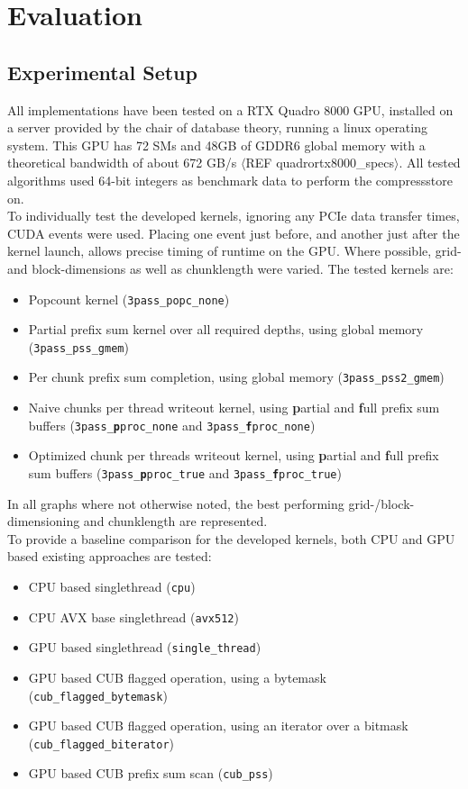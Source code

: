 \documentclass{tudscrreprt}
\newcommand{\markr}[1]{\textcolor{review}{$\langle$#1$\rangle$}}
\begin{document}
	\chapter{Evaluation}
	
		\section{Experimental Setup}
			All implementations have been tested on a RTX Quadro 8000 GPU, installed on a server provided by the chair of database theory, running a linux operating system. This GPU has 72 SMs and 48GB of GDDR6 global memory with a theoretical bandwidth of about 672 GB/s \markr{REF quadrortx8000\_specs}. All tested algorithms used 64-bit integers as benchmark data to perform the compressstore on. \\
			
			To individually test the developed kernels, ignoring any PCIe data transfer times, CUDA events were used. Placing one event just before, and another just after the kernel launch, allows precise timing of runtime on the GPU. Where possible, grid- and block-dimensions as well as chunklength were varied. The tested kernels are:\\
			\begin{itemize}
				\item Popcount kernel (\texttt{3pass\_popc\_none})
				\item Partial prefix sum kernel over all required depths, using global memory (\texttt{3pass\_pss\_gmem})
				\item Per chunk prefix sum completion, using global memory (\texttt{3pass\_pss2\_gmem})
				\item Naive chunks per thread writeout kernel, using \textbf{p}artial and \textbf{f}ull prefix sum buffers (\texttt{3pass\_\textbf{p}proc\_none} and \texttt{3pass\_\textbf{f}proc\_none})
				\item Optimized chunk per threads writeout kernel, using \textbf{p}artial and \textbf{f}ull prefix sum buffers (\texttt{3pass\_\textbf{p}proc\_true} and \texttt{3pass\_\textbf{f}proc\_true})
			\end{itemize}
			In all graphs where not otherwise noted, the best performing grid-/block-dimensioning and chunklength are represented. \\
			
			To provide a baseline comparison for the developed kernels, both CPU and GPU based existing approaches are tested:
			\begin{itemize}
				\item CPU based singlethread (\texttt{cpu})
				\item CPU AVX base singlethread (\texttt{avx512})
				\item GPU based singlethread (\texttt{single\_thread})
				\item GPU based CUB flagged operation, using a bytemask (\texttt{cub\_flagged\_bytemask})
				\item GPU based CUB flagged operation, using an iterator over a bitmask (\texttt{cub\_flagged\_biterator})
				\item GPU based CUB prefix sum scan (\texttt{cub\_pss})
			\end{itemize}
			
\end{document}
